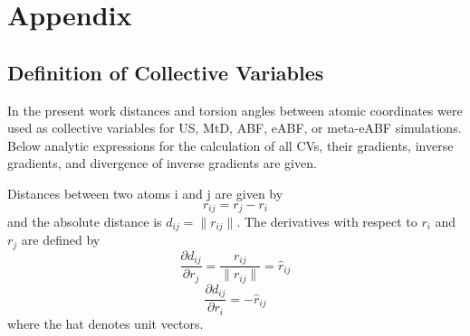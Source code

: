 \chapter{Appendix}
\label{cha:appendix}

\section{Definition of Collective Variables}
\label{sec:reaction coordinates}

In the present work distances and torsion angles between atomic coordinates were used as collective variables for US, MtD, ABF, eABF, or meta-eABF simulations.
Below analytic expressions for the calculation of all CVs, their gradients, inverse gradients, and divergence of inverse gradients are given.

Distances between two atoms i and j are given by
\begin{equation}
 r_{ij} = r_j - r_i
\end{equation}
and the absolute distance is $d_{ij} = \| r_{ij}\|$.
The derivatives with respect to $r_i$ and $r_j$ are defined by
\begin{equation}
  \frac{\partial d_{ij}}{\partial r_j} = \frac{r_{ij}}{\|r_{ij}\|} = \hat{r}_{ij}
\end{equation}
\begin{equation}
  \frac{\partial d_{ij}}{\partial r_i} = - \hat{r}_{ij}
\end{equation}
where the hat denotes unit vectors.
